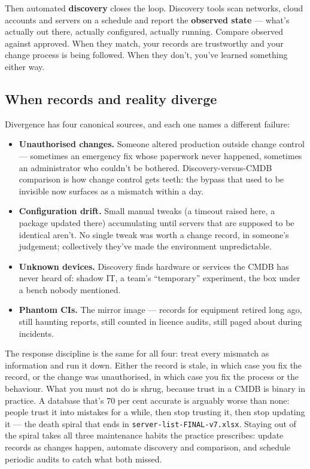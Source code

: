 Then automated \textbf{discovery} closes the loop. Discovery tools scan networks, cloud accounts and servers on a schedule and report the \textbf{observed state} — what's actually out there, actually configured, actually running. Compare observed against approved. When they match, your records are trustworthy and your change process is being followed. When they don't, you've learned something either way.



\subsection{When records and reality diverge}


Divergence has four canonical sources, and each one names a different failure:


\begin{itemize}[leftmargin=*]
\item \textbf{Unauthorised changes.} Someone altered production outside change control — sometimes an emergency fix whose paperwork never happened, sometimes an administrator who couldn't be bothered. Discovery-versus-CMDB comparison is how change control gets teeth: the bypass that used to be invisible now surfaces as a mismatch within a day.
\item \textbf{Configuration drift.} Small manual tweaks (a timeout raised here, a package updated there) accumulating until servers that are supposed to be identical aren't. No single tweak was worth a change record, in someone's judgement; collectively they've made the environment unpredictable.
\item \textbf{Unknown devices.} Discovery finds hardware or services the CMDB has never heard of: shadow IT, a team's ``temporary'' experiment, the box under a bench nobody mentioned.
\item \textbf{Phantom CIs.} The mirror image — records for equipment retired long ago, still haunting reports, still counted in licence audits, still paged about during incidents.
\end{itemize}

The response discipline is the same for all four: treat every mismatch as information and run it down. Either the record is stale, in which case you fix the record, or the change was unauthorised, in which case you fix the process or the behaviour. What you must not do is shrug, because trust in a CMDB is binary in practice. A database that's 70 per cent accurate is arguably worse than none: people trust it into mistakes for a while, then stop trusting it, then stop updating it — the death spiral that ends in \texttt{server-list-FINAL-v7.xlsx}. Staying out of the spiral takes all three maintenance habits the practice prescribes: update records as changes happen, automate discovery and comparison, and schedule periodic audits to catch what both missed.



